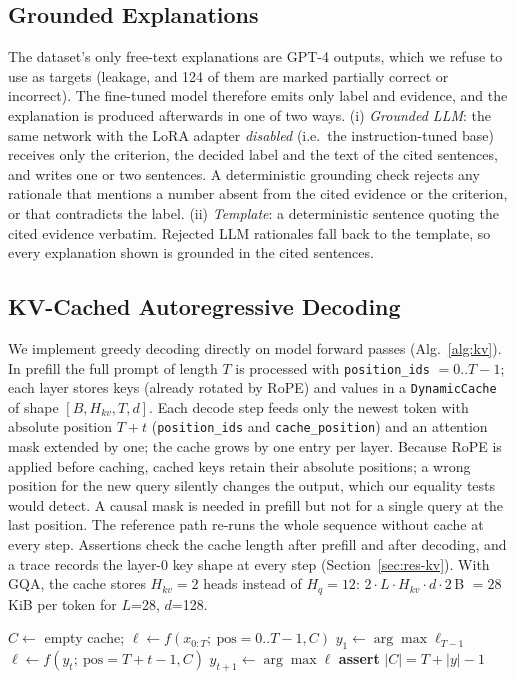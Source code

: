 \subsection{Grounded Explanations}\label{sec:explain}
The dataset's only free-text explanations are GPT-4 outputs, which we refuse to use as targets (leakage,
and 124 of them are marked partially correct or incorrect). The fine-tuned model therefore emits only label
and evidence, and the explanation is produced afterwards in one of two ways. (i) \emph{Grounded LLM}: the
same network with the LoRA adapter \emph{disabled} (i.e.\ the instruction-tuned base) receives only the
criterion, the decided label and the text of the cited sentences, and writes one or two sentences. A
deterministic grounding check rejects any rationale that mentions a number absent from the cited evidence or
the criterion, or that contradicts the label. (ii) \emph{Template}: a deterministic sentence quoting the cited
evidence verbatim. Rejected LLM rationales fall back to the template, so every explanation shown is grounded
in the cited sentences.

\subsection{KV-Cached Autoregressive Decoding}\label{sec:kv}
We implement greedy decoding directly on model forward passes (Alg.~\ref{alg:kv}). In prefill the full prompt
of length $T$ is processed with \texttt{position\_ids} $=0..T-1$; each layer stores keys (already rotated by
RoPE) and values in a \texttt{DynamicCache} of shape $[B, H_{kv}, T, d]$. Each decode step feeds only the
newest token with absolute position $T+t$ (\texttt{position\_ids} and \texttt{cache\_position}) and an
attention mask extended by one; the cache grows by one entry per layer. Because RoPE is applied before
caching, cached keys retain their absolute positions; a wrong position for the new query silently changes
the output, which our equality tests would detect. A causal mask is needed in prefill but not for a single
query at the last position. The reference path re-runs the whole sequence without cache at every step.
Assertions check the cache length after prefill and after decoding, and a trace records the layer-0 key
shape at every step (Section~\ref{sec:res-kv}). With GQA, the cache stores $H_{kv}=2$ heads instead of
$H_q=12$: $2\cdot L\cdot H_{kv}\cdot d\cdot 2$\,B $=28$\,KiB per token for $L$=28, $d$=128.

\begin{algorithm}[t]
\caption{KV-cached greedy decoding (batch 1)}\label{alg:kv}
\begin{algorithmic}[1]
\State $C\gets$ empty cache; $\ell \gets f(x_{0:T};\ \mathrm{pos}=0..T{-}1, C)$ 
\State $y_1\gets\arg\max \ell_{T-1}$
  \State $\ell\gets f(y_t;\ \mathrm{pos}=T{+}t{-}1, C)$ 
  \State $y_{t+1}\gets\arg\max \ell$
\EndFor
\State \textbf{assert} $|C| = T + |y| - 1$
\end{algorithmic}
\end{algorithm}

